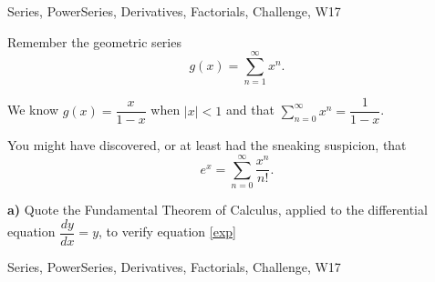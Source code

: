 \begin{tagblock}{Series, PowerSeries, Derivatives, Factorials, Challenge, W17}
\begin{question}

Remember the geometric series
 \begin{equation}\label{geo}
g(x)=\sum_{n=1}^{\infty}x^n.
\end{equation}

We know $g(x)=\dfrac x {1-x}$ when $|x|<1$ and that $\displaystyle\sum_{n=0}^{\infty}x^n=\dfrac 1 {1-x}$. 

You might have discovered, or at least had the sneaking suspicion, that 
\begin{equation}\label{exp}
e^x=\sum_{n=0}^{\infty}\frac{x^n}{n!}.
\end{equation}

\textbf{a)} Quote the Fundamental Theorem of Calculus, applied to the differential equation $\dfrac{dy}{dx}=y$, to verify equation \eqref{exp}
	
	
\begin{tags}
	    Series, PowerSeries, Derivatives, Factorials, Challenge, W17
\end{tags}
	
\begin{diary}
	    
\end{diary}
	
\begin{solution}
	   
\end{solution}
	
\end{question}

\end{tagblock}

 

